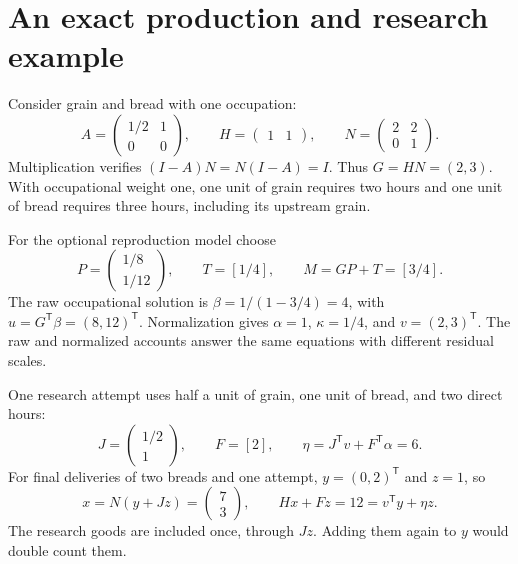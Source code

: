 \documentclass[11pt,a4paper]{article}
\begin{document}
\section{An exact production and research example}
Consider grain and bread with one occupation:
\begin{equation}
A=\begin{pmatrix}1/2&1\\0&0\end{pmatrix},\qquad
H=\begin{pmatrix}1&1\end{pmatrix},\qquad
N=\begin{pmatrix}2&2\\0&1\end{pmatrix}.
\end{equation}
Multiplication verifies $(I-A)N=N(I-A)=I$. Thus $G=HN=(2,3)$. With occupational weight one, one unit of grain requires two hours and one unit of bread requires three hours, including its upstream grain.

For the optional reproduction model choose
\begin{equation}
P=\begin{pmatrix}1/8\\1/12\end{pmatrix},\qquad
T=[1/4],\qquad M=GP+T=[3/4].
\end{equation}
The raw occupational solution is $\beta=1/(1-3/4)=4$, with $u=G^{\mathsf T}\beta=(8,12)^{\mathsf T}$. Normalization gives $\alpha=1$, $\kappa=1/4$, and $v=(2,3)^{\mathsf T}$. The raw and normalized accounts answer the same equations with different residual scales.

One research attempt uses half a unit of grain, one unit of bread, and two direct hours:
\begin{equation}
J=\begin{pmatrix}1/2\\1\end{pmatrix},\qquad F=[2],\qquad
\eta=J^{\mathsf T}v+F^{\mathsf T}\alpha=6.
\end{equation}
For final deliveries of two breads and one attempt, $y=(0,2)^{\mathsf T}$ and $z=1$, so
\begin{equation}
x=N(y+Jz)=\begin{pmatrix}7\\3\end{pmatrix},\qquad
Hx+Fz=12=v^{\mathsf T}y+\eta z.
\end{equation}
The research goods are included once, through $Jz$. Adding them again to $y$ would double count them.
\end{document}
